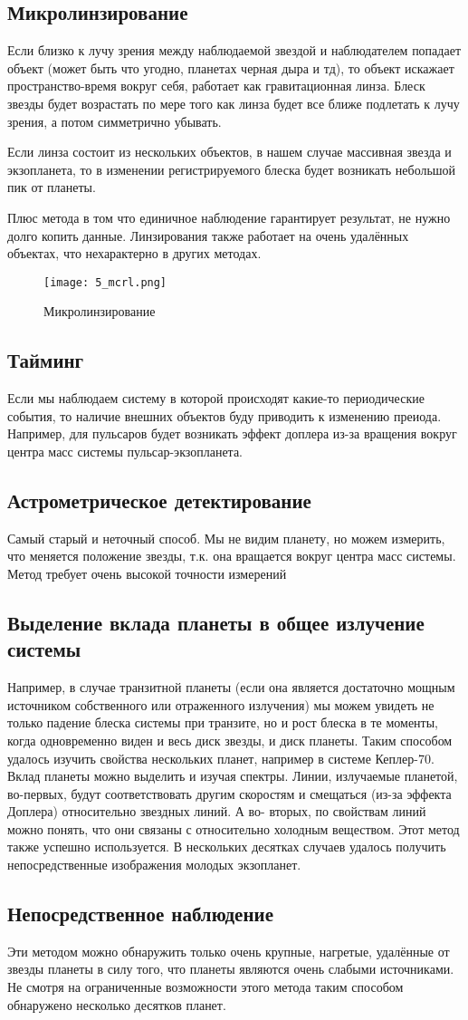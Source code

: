 \subsection{Микролинзирование}
Если близко к лучу зрения между наблюдаемой звездой и наблюдателем попадает объект (может быть что угодно, планетах черная дыра и тд), то объект искажает пространство-время вокруг себя, работает как гравитационная линза. Блеск звезды будет возрастать по мере того как линза будет все ближе подлетать к лучу зрения, а потом симметрично убывать.

 Если линза состоит из нескольких объектов, в нашем случае массивная звезда и экзопланета, то в изменении регистрируемого блеска будет возникать небольшой пик от планеты.

Плюс метода в том что единичное наблюдение гарантирует результат, не нужно долго копить данные. Линзирования также работает на очень удалённых объектах, что нехарактерно в других методах. 
\begin{figure}[H]
    \centering
    \texttt{[image: 5\_mcrl.png]}
    \caption{Микролинзирование}
    \label{fig:mcrl}
\end{figure}
\subsection{Тайминг}
Если мы наблюдаем систему в которой происходят какие-то периодические события, то наличие внешних объектов буду приводить к изменению преиода. Например, для пульсаров будет возникать эффект доплера из-за вращения вокруг центра масс системы пульсар-экзопланета.

\subsection{Астрометрическое детектирование}
Самый старый и неточный способ. Мы не видим планету, но можем измерить, что меняется положение звезды, т.к. она вращается вокруг центра масс системы. Метод требует очень высокой точности измерений 
\subsection{Выделение вклада планеты в общее излучение системы}
Например, в случае транзитной планеты (если она является достаточно мощным
 источником собственного или отраженного излучения) мы можем увидеть не только падение блеска системы при транзите, но и рост блеска в те моменты, когда одновременно виден и весь диск звезды, и диск планеты. Таким способом удалось изучить свойства нескольких планет, например в системе Кеплер-70. Вклад планеты можно выделить и изучая спектры. Линии, излучаемые планетой, во-первых, будут соответствовать другим скоростям и смещаться (из-за эффекта Доплера) относительно звездных линий. А во- вторых, по свойствам линий можно понять, что они связаны с относительно холодным веществом. Этот метод также успешно используется. В нескольких десятках случаев удалось получить непосредственные изображения молодых экзопланет.
\subsection{Непосредственное наблюдение}
Эти методом можно обнаружить только очень крупные, нагретые, удалённые от звезды планеты в силу того, что планеты являются очень слабыми источниками. Не смотря на ограниченные возможности этого метода таким способом обнаружено несколько десятков планет.
